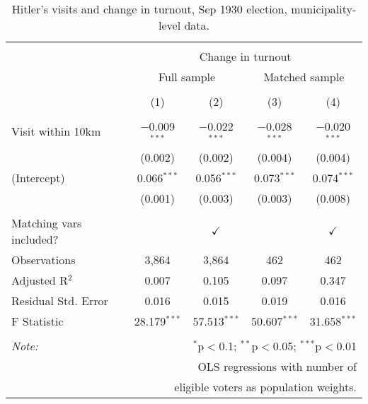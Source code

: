 
\begin{table}[!htbp] \centering 
  \caption{Hitler's visits and change in turnout, Sep 1930 election, municipality-level data.} 
  \label{tab:ols--5} 
\begin{tabular}{@{\extracolsep{5pt}}lcccc} 
\\[-1.8ex]\hline 
\hline \\[-1.8ex] 
 & \multicolumn{4}{c}{Change in turnout} \\ 
\cline{2-5} 
 & \multicolumn{2}{c}{Full sample} & \multicolumn{2}{c}{Matched sample} \\ 
\\[-1.8ex] & (1) & (2) & (3) & (4)\\ 
\hline \\[-1.8ex] 
 Visit within 10km & $-$0.009$^{***}$ & $-$0.022$^{***}$ & $-$0.028$^{***}$ & $-$0.020$^{***}$ \\ 
  & (0.002) & (0.002) & (0.004) & (0.004) \\ 
  (Intercept) & 0.066$^{***}$ & 0.056$^{***}$ & 0.073$^{***}$ & 0.074$^{***}$ \\ 
  & (0.001) & (0.003) & (0.003) & (0.008) \\ 
 \hline \\[-1.8ex] 
Matching vars included? &  & \multicolumn{1}{c}{$\checkmark$} &  & \multicolumn{1}{c}{$\checkmark$} \\ 
Observations & 3,864 & 3,864 & 462 & 462 \\ 
Adjusted R$^{2}$ & 0.007 & 0.105 & 0.097 & 0.347 \\ 
Residual Std. Error & 0.016 & 0.015 & 0.019 & 0.016 \\ 
F Statistic & 28.179$^{***}$ & 57.513$^{***}$ & 50.607$^{***}$ & 31.658$^{***}$ \\ 
\hline 
\hline \\[-1.8ex] 
\textit{Note:}  & \multicolumn{4}{r}{$^{*}$p$<$0.1; $^{**}$p$<$0.05; $^{***}$p$<$0.01} \\ 
 & \multicolumn{4}{r}{OLS regressions with number of} \\ 
 & \multicolumn{4}{r}{eligible voters as population weights.} \\ 
\end{tabular} 
\end{table} 
